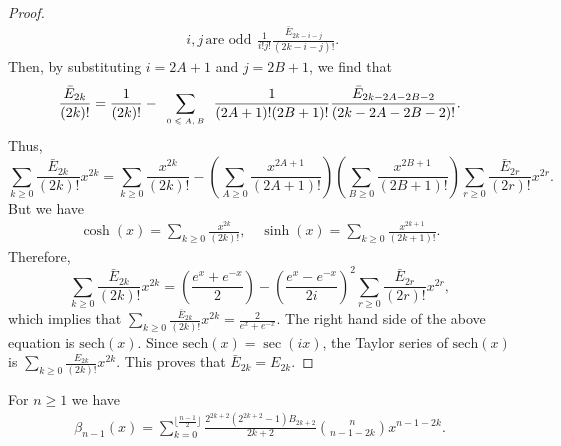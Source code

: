 \documentclass[11pt]{amsart}
\begin{document}
\begin{proof}
\begin{align*}
{\begin{array}{cc}
i,j \, \text{are odd}
\end{array}} \frac{1}{i! j!}\frac{\bar{E}_{2k-i-j}}{(2k-i-j)!}.
\end{align*}
Then, by substituting $i=2A
+1$ and $j=2B+1$, we find that
\begin{align*}
\frac{\bar{E}_{2k}}{(2k)!}=\frac{1}{(2k)!}-\sum_{\tiny
\begin{array}{c}
0\leqslant A,B
\end{array}} \frac{1}{(2A+1)! (2B+1)!}\frac{\bar{E}_{2k-2A-2B-2}}{(2k-2A-2B-2)!}.
\end{align*}
Thus,  
\[
\sum_{k \geqslant 0}\frac{\bar{E}_{2k}}{(2k)!}x^{2k} = \sum_{k \geq 0}\frac{x^{2k}}{(2k)!} - \left(\sum_{A \geq 0} \frac{x^{2A+1}}{(2A+1)!}\right)\left(\sum_{B \geq 0} \frac{x^{2B+1}}{(2B+1)!}\right)\sum_{r \geqslant 0}\frac{\bar{E}_{2r}}{(2r)!}x^{2r}.
\]
But we have
\begin{align*}
\cosh(x)=\sum_{k \geq 0}\frac{x^{2k}}{(2k)!}, \quad \sinh(x)=\sum_{k \geq 0} \frac{x^{2k+1}}{(2k+1)!}.
\end{align*}
Therefore,
\[
\sum_{k \geqslant 0}\frac{\bar{E}_{2k}}{(2k)!}x^{2k} =
\left(\frac{e^{x} + e^{-x}}{2}\right) -
\left(\frac{e^{x} - e^{-x}}{2i}\right)^2 \sum_{r \geqslant 0}\frac{\bar{E}_{2r}}{(2r)!}x^{2r},
\]
which implies that
$
\sum_{ k \geqslant 0}\frac{\bar{E}_{2k}}{(2k)!}x^{2k}=
\frac{2}{e^{x}+e^{-x}}$.
The right hand side of the above equation is $\text{sech}(x)$. Since $\text{sech}(x)=\sec(ix)$, the Taylor series of $\text{sech}(x)$ is 
$\sum_{k \geqslant 0}\frac{E_{2k}}{(2k)!}x^{2k}$. 
This proves that  $\bar{E}_{2k}=E_{2k}$.
\end{proof}
\begin{prp}\label{beta(x)}
For $n\geq 1 $ we have \begin{align*}
\beta_{n-1}(x)=\sum_{k=0}^{\lfloor \frac{n-1}{2}\rfloor} \frac{2^{2k+2}(2^{2k+2}-1)B_{2k+2}}{2k+2}
{n \choose n-1-2k}x^{n-1-2k}.
\end{align*}
\end{prp}
\end{document}
